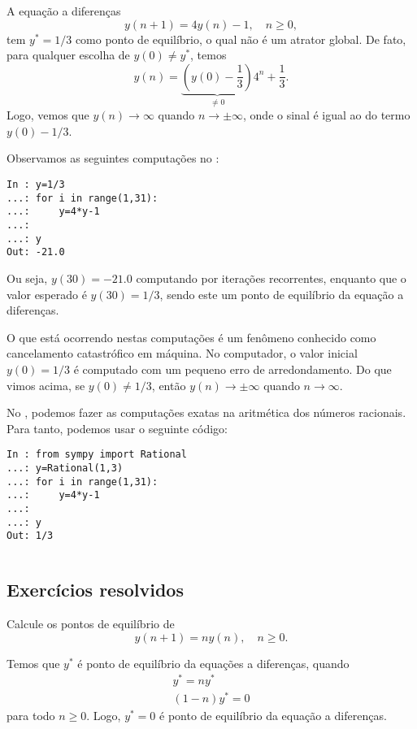 \begin{ex}
  A equação a diferenças
  \begin{equation}
    y(n+1) = 4y(n) - 1,\quad n\geq 0,
  \end{equation}
  tem $y^* = 1/3$ como ponto de equilíbrio, o qual não é um atrator global. De fato, para qualquer escolha de $y(0)\neq y^*$, temos
  \begin{equation}
    y(n) = \underbrace{\left(y(0) - \frac{1}{3}\right)}_{\neq 0}4^n + \frac{1}{3}.
  \end{equation}
  Logo, vemos que $y(n)\to\infty$ quando $n\to\pm\infty$, onde o sinal é igual ao do termo $y(0)-1/3$.

  \ifispython
  Observamos as seguintes computações no \python:
\begin{verbatim}
In : y=1/3
...: for i in range(1,31):
...:     y=4*y-1
...: 
...: y
Out: -21.0
\end{verbatim}
  Ou seja, $y(30)=-21.0$ computando por iterações recorrentes, enquanto que o valor esperado é $y(30)=1/3$, sendo este um ponto de equilíbrio da equação a diferenças.

  O que está ocorrendo nestas computações é um fenômeno conhecido como cancelamento catastrófico em máquina. No computador, o valor inicial $y(0)=1/3$ é computado com um pequeno erro de arredondamento. Do que vimos acima, se $y(0)\neq 1/3$, então $y(n)\to\pm\infty$ quando $n\to\infty$.

  No \python, podemos fazer as computações exatas na aritmética dos números racionais. Para tanto, podemos usar o seguinte código:
\begin{verbatim}
In : from sympy import Rational
...: y=Rational(1,3)
...: for i in range(1,31):
...:     y=4*y-1
...: 
...: y
Out: 1/3
\end{verbatim}
\begin{verbatim}

\end{verbatim}
  \fi
\end{ex}

\subsection*{Exercícios resolvidos}

\begin{exeresol}
  Calcule os pontos de equilíbrio de
  \begin{equation}
    y(n+1) = ny(n),\quad n\geq 0.
  \end{equation}
\end{exeresol}
\begin{resol}
  Temos que $y^*$ é ponto de equilíbrio da equações a diferenças, quando
  \begin{gather}
    y^* = ny^*\\
    (1-n)y^* = 0
  \end{gather}
  para todo $n\geq 0$. Logo, $y^*=0$ é ponto de equilíbrio da equação a diferenças.
\end{resol}

